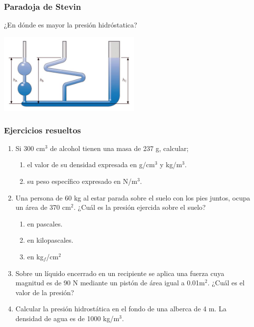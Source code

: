 \documentclass[handout]{beamer}
\begin{document}
\begin{frame}
  \frametitle{Paradoja de Stevin}
  {\large ¿En dónde es mayor la presión hidróstatica?}
  \begin{center}
    \includegraphics[width=7cm]{vasos_comunicantes}
  \end{center}
\end{frame}


\begin{frame}[allowframebreaks,t]
  \frametitle{Ejercicios resueltos}
  \begin{enumerate}
  \item Si 300 cm$^3$ de alcohol tienen una masa de 237 g, calcular;
    \begin{enumerate}
    \item el valor de su densidad expresada en g/cm$^3$ y kg/m$^3$.
    \item su peso específico expresado en N/m$^3$.  
    \end{enumerate}
  \item Una persona de 60 kg al estar parada sobre el suelo con los pies juntos, ocupa un
    área de 370 cm$^2$. ¿Cuál es la presión ejercida sobre el suelo?
    \begin{enumerate}
    \item en pascales.
    \item en kilopascales.
    \item en kg$_{f}$/cm$^2$
    \end{enumerate}
  \item Sobre un líquido encerrado en un recipiente se aplica una fuerza cuya magnitud es
    de 90 N mediante un pistón de área igual a 0.01m$^2$. ¿Cuál es el valor de la presión?
  \item Calcular la presión hidrostática en el fondo de una alberca de 4 m. La densidad de
    agua es de 1000 kg/m$^3$.
  \end{enumerate}
\end{frame}
\end{document}
